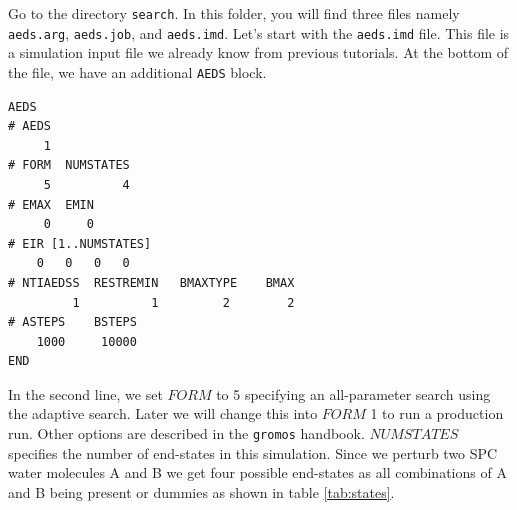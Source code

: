 Go to the directory \texttt{search}. In this folder, you will find three files namely \texttt{aeds.arg}, \texttt{aeds.job}, and \texttt{aeds.imd}. Let's start with the \texttt{aeds.imd} file. This file is a simulation input file we already know from previous tutorials. At the bottom of the file, we have an additional \texttt{AEDS} block.
\begin{lstlisting}
AEDS
# AEDS
     1
# FORM  NUMSTATES
     5          4
# EMAX  EMIN
     0     0
# EIR [1..NUMSTATES]
    0   0   0   0 
# NTIAEDSS  RESTREMIN   BMAXTYPE    BMAX 
         1          1         2        2    
# ASTEPS    BSTEPS
    1000     10000 
END
\end{lstlisting}
In the second line, we set $FORM$ to 5 specifying an all-parameter search using the adaptive search.
Later we will change this into $FORM$ 1 to run a production run. Other options are described in the  \texttt{gromos} handbook. $NUMSTATES$ specifies the number of end-states in this simulation. Since we perturb two SPC water molecules A and B we get four possible end-states as all combinations of A and B being present or dummies as shown in table \ref{tab:states}.

